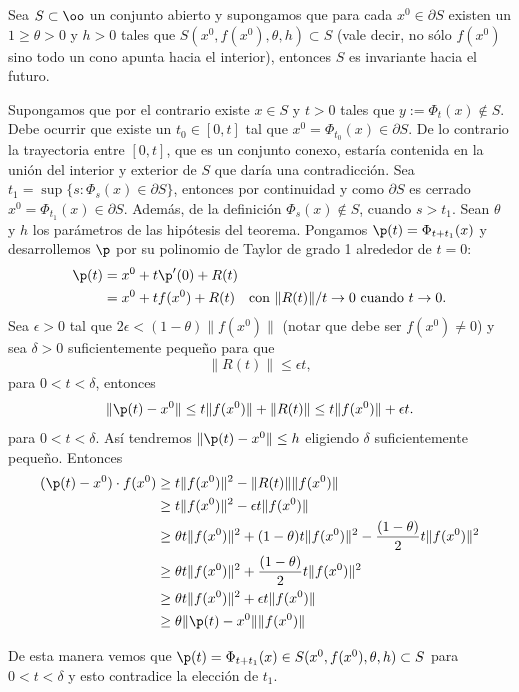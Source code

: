 \begin{teorema}\label{conjuninva} Sea $S\subset\oo$ un conjunto abierto y supongamos
que para cada $x^0\in\partial S$ existen un $1\geq\theta>0$ y
$h>0$ tales que   $S(x^0,f(x^0),\theta,h)\subset S$ (vale decir,
no sólo $f(x^0)$ sino todo un cono apunta hacia el interior),
entonces $S$ es invariante hacia el futuro.
\end{teorema}
\begin{demo} Supongamos que por el contrario existe $x\in S$ y $t>0$ tales que
 $y:=\Phi_t(x)\notin S$. Debe ocurrir que existe un $t_0\in[0,t]$
 tal que $x^0=\Phi_{t_0}(x)\in\partial S$. De lo contrario la
 trayectoria entre $[0,t]$, que es un conjunto conexo, estaría contenida
 en la unión del interior y exterior de $S$ que daría una
 contradicción. Sea $t_1=\sup\{s:\Phi_s(x)\in\partial S\}$,
 entonces por continuidad y como $\partial S$ es cerrado
 $x^0=\Phi_{t_1}(x)\in\partial S$. Además, de la definición
 $\Phi_s(x)\notin S$, cuando $s>t_1$. Sean $\theta$ y $h$
 los parámetros de las hipótesis del teorema. Pongamos $\p(t)=\Phi_{t+t_1}(x)$ y
 desarrollemos $\p$ por su polinomio de Taylor de grado 1 alrededor de $t=0$:
 \begin{equation}\label{taylorlinea}
   \begin{split}
    \p(t)&=x^0+t\p'(0)+R(t)\\
    &=x^0+tf(x^0)+R(t)\quad\hbox{con }\|R(t)\|/t\to 0\hbox{ cuando
    }t\to 0.
   \end{split}
 \end{equation}
Sea $\epsilon>0$ tal que $2\epsilon<(1-\theta)\|f(x^0)\|$ (notar
que debe ser $f(x^0)\neq 0$) y sea $\delta>0$ suficientemente
pequeño para que
\[
\|R(t)\|\leq \epsilon t, \]
 para $0<t<\delta$, entonces
\[
    \|\p(t)-x^0\|\leq t\|f(x^0)\|+\|R(t)\|\leq
    t\|f(x^0)\|+\epsilon t.
\]
para $0<t<\delta $. Así tendremos $\|\p(t)-x^0\|\leq h$ eligiendo
$\delta$ suficientemente pequeño. Entonces
\[
    \begin{split}
    (\p(t)-x^0)\cdot f(x^0)&\geq t\|f(x^0)\|^2-\|R(t)\| \|f(x^0)\|\\
    &\geq t\|f(x^0)\|^2-\epsilon t \|f(x^0)\|\\
    &\geq\theta t\|f(x^0)\|^2+ (1-\theta)t\|f(x^0)\|^2-\frac{(1-\theta)}{2} t\|f(x^0)\|^2\\
    &\geq\theta t\|f(x^0)\|^2+
    \frac{(1-\theta)}{2}t\|f(x^0)\|^2\\
     &\geq\theta t\|f(x^0)\|^2+
    \epsilon t\|f(x^0)\|\\
    &\geq \theta\|\p(t)-x^0\|\|f(x^0)\|
    \end{split}
\]

De esta manera vemos que $\p(t)=\Phi_{t+t_1}(x)\in
S(x^0,f(x^0),\theta,h)\subset S$ para $0<t<\delta$ y esto
contradice la elección de $t_1$. \end{demo}


